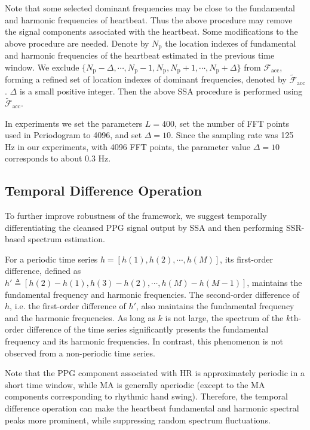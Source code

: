 \documentclass[10pt,twocolumn]{IEEEtran}
\begin{document}
Note that some selected dominant frequencies  may be close to the fundamental and harmonic frequencies of heartbeat. Thus the above procedure may remove the signal components associated with the heartbeat. Some modifications to the above procedure are needed. Denote by $N_{\mathrm{p}}$ the location indexes of fundamental and harmonic frequencies of the heartbeat estimated in the previous time window. We exclude $\{ N_{\mathrm{p}}-\Delta, \cdots, N_{\mathrm{p}}-1, N_{\mathrm{p}}, N_{\mathrm{p}}+1, \cdots, N_{\mathrm{p}}+\Delta    \}$ from $\mathcal{F}_{\mathrm{acc}}$, forming a refined set of location indexes of dominant frequencies, denoted by  $\widetilde{\mathcal{F}}_{\mathrm{acc}}$. $\Delta$ is a small positive integer. Then the above SSA procedure is performed using $\widetilde{\mathcal{F}}_{\mathrm{acc}}$.


In experiments we set the parameters $L=400$, set the number of FFT points used in Periodogram  to 4096, and set $\Delta=10$. Since the sampling rate was 125 Hz in our experiments, with 4096 FFT points, the parameter value $\Delta=10$ corresponds to about 0.3 Hz.






\subsection{Temporal Difference Operation}

To further improve robustness of the framework, we suggest temporally differentiating the cleansed PPG signal output by SSA and then performing SSR-based spectrum estimation.



For a periodic time series $h = [h(1),h(2),\cdots,h(M)]$, its first-order difference, defined as $h'\triangleq [h(2)-h(1), h(3)-h(2), \cdots, h(M)-h(M-1)]$, maintains the fundamental frequency and harmonic frequencies. The second-order difference of $h$, i.e. the first-order difference of $h'$, also maintains the fundamental frequency and the harmonic frequencies. As long as $k$ is not large, the spectrum of the $k$th-order difference of the time series  significantly presents the fundamental frequency and its harmonic frequencies. In contrast, this phenomenon is not observed from a non-periodic time series.


Note that the PPG component associated with HR is approximately periodic in a short time window, while MA is generally aperiodic (except to the MA components corresponding to rhythmic hand swing). Therefore, the temporal difference operation can make the heartbeat fundamental and harmonic spectral peaks more prominent, while suppressing random spectrum fluctuations.
\end{document}
